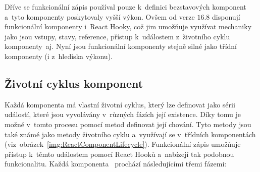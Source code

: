 Dříve se funkcionální zápis používal pouze k~definici bezstavových komponent a~tyto komponenty poskytovaly vyšší výkon. Ovšem od verze $16.8$ disponují funkcionální komponenty i~React Hooky, což jim umožňuje využívat mechaniky jako jsou vstupy, stavy, reference, přístup k~událostem z~životního cyklu komponenty~aj. Nyní jsou funkcionální komponenty stejně silné jako třídní komponenty (i z~hlediska výkonu).

\subsection{Životní cyklus komponent}
Každá komponenta má vlastní životní cyklus, který lze definovat jako sérii událostí, které jsou vyvolávány v~různých fázích její existence. Díky tomu je možné v~tomto procesu pomocí metod definovat její chování. Tyto metody jsou také známé jako metody životního cyklu a~využívají se v~třídních komponentách (viz~obrázek~\ref{img:ReactComponentLifecycle}). Funkcionální zápis umožňuje přístup k~těmto událostem pomocí React Hooků a~nabízejí tak podobnou funkcionalitu. Každá komponenta~\cite{website:ReactComponentsLifecycle, website:ComponentsLifecycleInReact, thesis:WebApp} prochází následujícími třemi fázemi:

